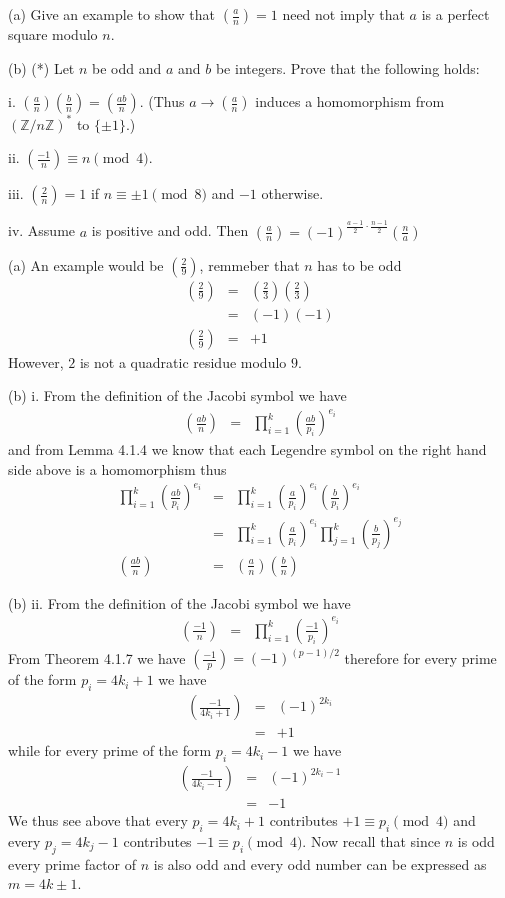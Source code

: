 \documentclass[aps,preprint,preprintnumbers,nofootinbib,showpacs,prd]{revtex4-1}
\newcommand{\nbea}{\begin{eqnarray*}}
\newcommand{\neea}{\end{eqnarray*}}
\begin{document}
(a) Give an example to show that $\left ( \frac{a}{n} \right ) = 1$ need not imply that $a$ is a perfect square modulo $n$.

(b) (*) Let $n$ be odd and $a$ and $b$ be integers. Prove that the following holds: 

i. $\left ( \frac{a}{n}\right )\left ( \frac{b}{n}\right )=\left ( \frac{ab}{n}\right )$. (Thus $a \rightarrow \left ( \frac{a}{n}\right )$ induces a homomorphism from $( \mathbb{Z}/n\mathbb{Z})^*$ to $\{\pm1\}$.) 

ii. $\left ( \frac{-1}{n}\right )\equiv n \pmod{4}$.

iii. $\left ( \frac{2}{n}\right ) = 1$ if $n \equiv \pm 1 \pmod{8}$ and $-1$ otherwise.

iv. Assume $a$ is positive and odd. Then $\left ( \frac{a}{n}\right ) = (-1)^{\frac{a-1}{2}\cdot\frac{n-1}{2}} \left (\frac{n}{a} \right ) $

(a) An example would be $\left( \frac{2}{9}\right )$, remmeber that $n$ has to be odd
%
\nbea
\left( \frac{2}{9}\right ) & = & \left( \frac{2}{3}\right ) \left( \frac{2}{3}\right ) \\
& = & (-1)(-1) \\
\left( \frac{2}{9}\right ) & = & +1
\neea
%
However, $2$ is not a quadratic residue modulo $9$.

(b) i. From the definition of the Jacobi symbol we have
%
\nbea
\left ( \frac{ab}{n}\right ) & = & \prod_{i=1}^k \left ( \frac{ab}{p_i} \right )^{e_i}
\neea
%
and from Lemma 4.1.4 we know that each Legendre symbol on the right hand side above is a homomorphism thus 
%
\nbea
\prod_{i=1}^k \left ( \frac{ab}{p_i} \right )^{e_i} & = & \prod_{i=1}^k \left ( \frac{a}{p_i} \right )^{e_i} \left ( \frac{b}{p_i} \right )^{e_i} \\
& = & \prod_{i=1}^k \left ( \frac{a}{p_i} \right )^{e_i} \prod_{j=1}^k \left ( \frac{b}{p_j} \right )^{e_j} \\
\left ( \frac{ab}{n}\right ) & = & \left ( \frac{a}{n}\right )\left ( \frac{b}{n}\right )
\neea
%

(b) ii. From the definition of the Jacobi symbol we have
%
\nbea
\left ( \frac{-1}{n}\right ) & = & \prod_{i=1}^k \left ( \frac{-1}{p_i} \right )^{e_i}
\neea
%
From Theorem 4.1.7 we have $\left ( \frac{-1}{p}\right ) = (-1)^{(p-1)/2}$ therefore for every prime of the form $p_i = 4k_i+1$ we have
%
\nbea
\left ( \frac{-1}{4k_i+1}\right ) & = & (-1)^{2k_i} \\
& = & +1
\neea
%
while for every prime of the form $p_i = 4k_i-1$ we have
%
\nbea
\left ( \frac{-1}{4k_i-1}\right ) & = & (-1)^{2k_i-1} \\
& = & -1
\neea
%
We thus see above that every $p_i = 4k_i + 1$ contributes $+1 \equiv p_i \pmod{4}$ and every $p_j = 4k_j - 1$ contributes $-1 \equiv p_i \pmod{4}$. Now recall that since $n$ is odd every prime factor of $n$ is also odd and every odd number can be expressed as $m = 4k \pm 1$.
\end{document}
